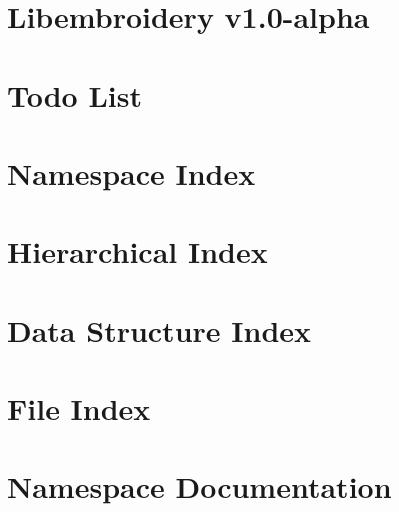 \documentclass[twoside]{book}
\newcommand{\+}{\discretionary{\mbox{\scriptsize$\hookleftarrow$}}{}{}}
\begin{document}
\chapter{Libembroidery v1.0-\/alpha}
\label{md_README}

\chapter{Todo List}
\label{todo}

\chapter{Namespace Index}

\chapter{Hierarchical Index}

\chapter{Data Structure Index}

\chapter{File Index}

\chapter{Namespace Documentation}









\end{document}
